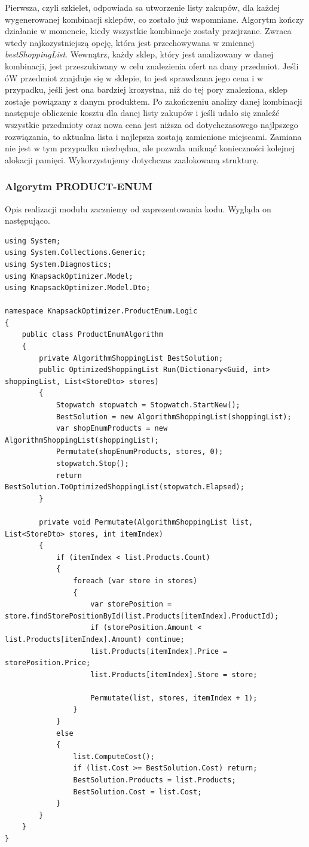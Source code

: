\documentclass[a4paper]{article}
\begin{document}
Pierwsza, czyli szkielet, odpowiada sa utworzenie listy zakupów, dla każdej wygenerowanej kombinacji sklepów, co zostało już wspomniane. Algorytm kończy działanie w momencie, kiedy wszystkie kombinacje zostały przejrzane. Zwraca wtedy najkozystniejszą opcję, która jest przechowywana w zmiennej \textit{bestShoppingList}. Wewnątrz, każdy sklep, który jest analizowany w danej kombinacji, jest przeszukiwany w celu znalezienia ofert na dany przedmiot. Jeśli óW przedmiot znajduje się w sklepie, to jest sprawdzana jego cena i w przypadku, jeśli jest ona bardziej krozystna, niż do tej pory znaleziona, sklep zostaje powiązany z danym produktem. Po zakończeniu analizy danej kombinacji następuje obliczenie kosztu dla danej listy zakupów i jeśli udało się znaleźć wszystkie przedmioty oraz nowa cena jest niższa od dotychczasowego najlpszego rozwiązania, to aktualna lista i najlepsza zostają zamienione miejscami. Zamiana nie jest w tym przypadku niezbędna, ale pozwala uniknąć konieczności kolejnej alokacji pamięci. Wykorzystujemy dotychczas zaalokowaną strukturę.

\subsubsection{Algorytm PRODUCT-ENUM}
Opis realizacji modułu zaczniemy od zaprezentowania kodu. Wygląda on następująco.
\begin{lstlisting}
using System;
using System.Collections.Generic;
using System.Diagnostics;
using KnapsackOptimizer.Model;
using KnapsackOptimizer.Model.Dto;

namespace KnapsackOptimizer.ProductEnum.Logic
{
	public class ProductEnumAlgorithm
	{
		private AlgorithmShoppingList BestSolution;
		public OptimizedShoppingList Run(Dictionary<Guid, int> shoppingList, List<StoreDto> stores)
		{
			Stopwatch stopwatch = Stopwatch.StartNew();
			BestSolution = new AlgorithmShoppingList(shoppingList);    
			var shopEnumProducts = new AlgorithmShoppingList(shoppingList);
			Permutate(shopEnumProducts, stores, 0);
			stopwatch.Stop();
			return BestSolution.ToOptimizedShoppingList(stopwatch.Elapsed);
		}

		private void Permutate(AlgorithmShoppingList list, List<StoreDto> stores, int itemIndex)
		{
			if (itemIndex < list.Products.Count)
			{
				foreach (var store in stores)
				{
					var storePosition = store.findStorePositionById(list.Products[itemIndex].ProductId);
					if (storePosition.Amount < list.Products[itemIndex].Amount) continue;
					list.Products[itemIndex].Price = storePosition.Price;
					list.Products[itemIndex].Store = store;

					Permutate(list, stores, itemIndex + 1);
				}
			}
			else
			{
				list.ComputeCost();
				if (list.Cost >= BestSolution.Cost) return;
				BestSolution.Products = list.Products;
				BestSolution.Cost = list.Cost;
			}
		}
	}
}

\end{lstlisting}
\end{document}
